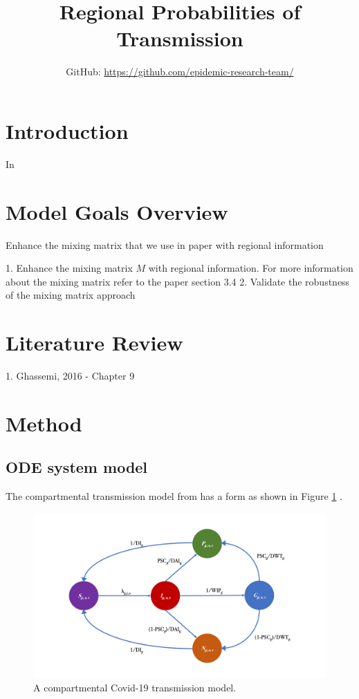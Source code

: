 \documentclass[12pt]{article}
\title{Regional Probabilities of Transmission}
\author{GitHub: \url{https://github.com/epidemic-research-team/}}
\begin{document}
\maketitle

\section{Introduction}

In 

\section{Model Goals Overview}

Enhance the mixing matrix that we use in \cite{Gareth:2013} paper with regional information

1. Enhance the mixing matrix $M$ with regional information. For more information about the mixing matrix refer to the paper section 3.4
2. Validate the robustness of the mixing matrix approach

\section{Literature Review}

1. Ghassemi, 2016 - Chapter 9

\section{Method}

\subsection{ODE system model}

The compartmental transmission model from \cite{Gareth:2013} has a form as shown in Figure \ref{fig:model} \cite[p.5]{Gareth:2013}. 

\begin{figure}[h!]
\centering
\includegraphics[width=1\textwidth]{COVIDb}
\caption{A compartmental Covid-19 transmission model.}
\label{fig:model}
\end{figure}
\end{document}
